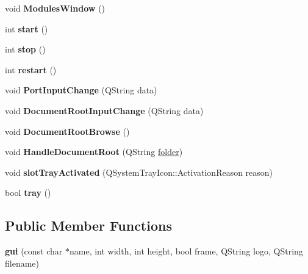 \begin{DoxyCompactItemize}
\item 
\hypertarget{classgui_aada4b3c2985867563163060b0ea7790a}{
void {\bfseries ModulesWindow} ()}
\label{classgui_aada4b3c2985867563163060b0ea7790a}

\item 
\hypertarget{classgui_a635d4673ab60e67174d1070188d45cde}{
int {\bfseries start} ()}
\label{classgui_a635d4673ab60e67174d1070188d45cde}

\item 
\hypertarget{classgui_a25ea2b9bce229c4955b6cf426f865ff4}{
int {\bfseries stop} ()}
\label{classgui_a25ea2b9bce229c4955b6cf426f865ff4}

\item 
\hypertarget{classgui_aa714d6bf36da2b9d2410aa556f6cf7c0}{
int {\bfseries restart} ()}
\label{classgui_aa714d6bf36da2b9d2410aa556f6cf7c0}

\item 
\hypertarget{classgui_a70aa201aa78f95ff25d15ce177a46b88}{
void {\bfseries PortInputChange} (QString data)}
\label{classgui_a70aa201aa78f95ff25d15ce177a46b88}

\item 
\hypertarget{classgui_a6a0822f02ed0c3cd48b6a59349e4827c}{
void {\bfseries DocumentRootInputChange} (QString data)}
\label{classgui_a6a0822f02ed0c3cd48b6a59349e4827c}

\item 
\hypertarget{classgui_a1ab76a511d9af11dcf4857233fcd2d39}{
void {\bfseries DocumentRootBrowse} ()}
\label{classgui_a1ab76a511d9af11dcf4857233fcd2d39}

\item 
\hypertarget{classgui_a2777443c9f0136f570e1f31f45443782}{
void {\bfseries HandleDocumentRoot} (QString \hyperlink{structfolder}{folder})}
\label{classgui_a2777443c9f0136f570e1f31f45443782}

\item 
\hypertarget{classgui_ab985f43855c8bb7a20f2028882ebc263}{
void {\bfseries slotTrayActivated} (QSystemTrayIcon::ActivationReason reason)}
\label{classgui_ab985f43855c8bb7a20f2028882ebc263}

\item 
\hypertarget{classgui_a072be3b09b6fccdbe12cf2d335277b65}{
bool {\bfseries tray} ()}
\label{classgui_a072be3b09b6fccdbe12cf2d335277b65}

\end{DoxyCompactItemize}
\subsection*{Public Member Functions}
\begin{DoxyCompactItemize}
\item 
\hypertarget{classgui_a4039d74471f0f05e7d64a1459d7c4e41}{
{\bfseries gui} (const char $\ast$name, int width, int height, bool frame, QString logo, QString filename)}
\label{classgui_a4039d74471f0f05e7d64a1459d7c4e41}

\end{DoxyCompactItemize}
